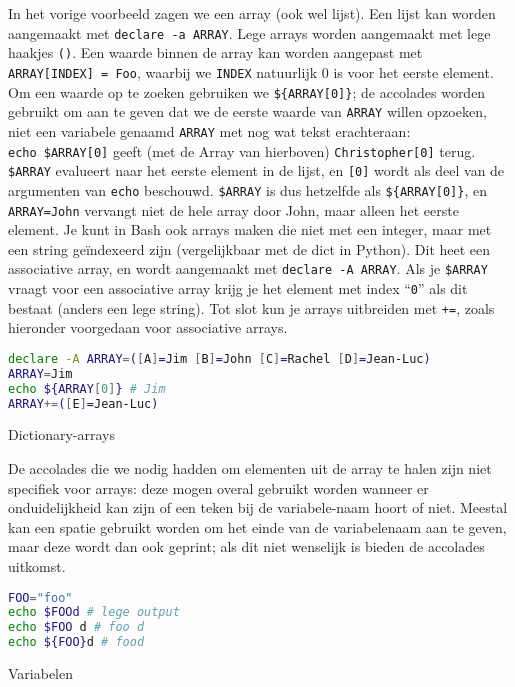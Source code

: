 In het vorige voorbeeld zagen we een array (ook wel lijst). Een lijst kan worden aangemaakt met \texttt{declare\ -a\ ARRAY}. Lege arrays worden aangemaakt met lege haakjes \texttt{()}. Een waarde binnen de array kan worden aangepast met \texttt{ARRAY{[}INDEX{]}\ =\ Foo}, waarbij we \texttt{INDEX} natuurlijk 0 is voor het eerste element. Om een waarde op te zoeken gebruiken we \texttt{\$\{ARRAY{[}0{]}\}}; de accolades worden gebruikt om aan te geven dat we de eerste waarde van \texttt{ARRAY} willen opzoeken, niet een variabele genaamd \texttt{ARRAY} met nog wat tekst erachteraan: \texttt{echo\ \$ARRAY{[}0{]}} geeft (met de Array van hierboven) \texttt{Christopher{[}0{]}} terug. \texttt{\$ARRAY} evalueert naar het eerste element in de lijst, en \texttt{{[}0{]}} wordt als deel van de argumenten van \texttt{echo} beschouwd. \texttt{\$ARRAY} is dus hetzelfde als \texttt{\$\{ARRAY{[}0{]}\}}, en \texttt{ARRAY=John} vervangt niet de hele array door John, maar alleen het eerste element. Je kunt in Bash ook arrays maken die niet met een integer, maar met een string geïndexeerd zijn (vergelijkbaar met de dict in Python). Dit heet een associative array, en wordt aangemaakt met \texttt{declare\ -A\ ARRAY}. Als je \texttt{\$ARRAY} vraagt voor een associative array krijg je het element met index ``\texttt{0}'' als dit bestaat (anders een lege string). Tot slot kun je arrays uitbreiden met \texttt{+=}, zoals hieronder voorgedaan voor associative arrays.

\begin{listing}
\begin{lstlisting}[language=bash]
declare -A ARRAY=([A]=Jim [B]=John [C]=Rachel [D]=Jean-Luc)
ARRAY=Jim
echo ${ARRAY[0]} # Jim
ARRAY+=([E]=Jean-Luc)
\end{lstlisting}
\caption{Dictionary-arrays}
\end{listing}

De accolades die we nodig hadden om elementen uit de array te halen zijn niet specifiek voor arrays: deze mogen overal gebruikt worden wanneer er onduidelijkheid kan zijn of een teken bij de variabele-naam hoort of niet. Meestal kan een spatie gebruikt worden om het einde van de variabelenaam aan te geven, maar deze wordt dan ook geprint; als dit niet wenselijk is bieden de accolades uitkomst.

\begin{listing}
\begin{lstlisting}[language=bash]
FOO="foo"
echo $FOOd # lege output
echo $FOO d # foo d
echo ${FOO}d # food
\end{lstlisting}
\caption{Variabelen}
\end{listing}

